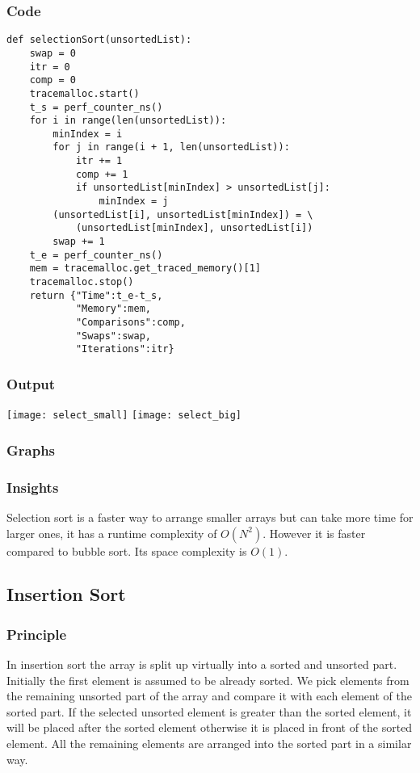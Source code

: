 \documentclass[12pt]{article}
\begin{document}
\subsubsection*{Code}
\begin{verbatim}
def selectionSort(unsortedList):
    swap = 0
    itr = 0
    comp = 0
    tracemalloc.start()
    t_s = perf_counter_ns()
    for i in range(len(unsortedList)):
        minIndex = i
        for j in range(i + 1, len(unsortedList)):
            itr += 1
            comp += 1
            if unsortedList[minIndex] > unsortedList[j]:
                minIndex = j
        (unsortedList[i], unsortedList[minIndex]) = \
            (unsortedList[minIndex], unsortedList[i])
        swap += 1
    t_e = perf_counter_ns()
    mem = tracemalloc.get_traced_memory()[1]
    tracemalloc.stop()
    return {"Time":t_e-t_s,
            "Memory":mem,
            "Comparisons":comp,
            "Swaps":swap,
            "Iterations":itr}
\end{verbatim}
\subsubsection*{Output}
\texttt{[image: select\_small]}
\texttt{[image: select\_big]}
\subsubsection*{Graphs}





\subsubsection*{Insights}
Selection sort is a faster way to arrange smaller arrays but can
take more time for larger ones, it has a runtime complexity of
$O(N^2)$. However it is faster compared to bubble sort. Its space
complexity is $O(1)$.
\subsection{Insertion Sort}
\subsubsection*{Principle}
In insertion sort the array is split up virtually into a sorted
and unsorted part. Initially the first element is assumed to be
already sorted. We pick elements from the remaining unsorted part
of the array and compare it with each element of the sorted part.
If the selected unsorted element is greater than the sorted
element, it will be placed after the sorted element otherwise it
is placed in front of the sorted element. All the remaining
elements are arranged into the sorted part in a similar way.
\end{document}

